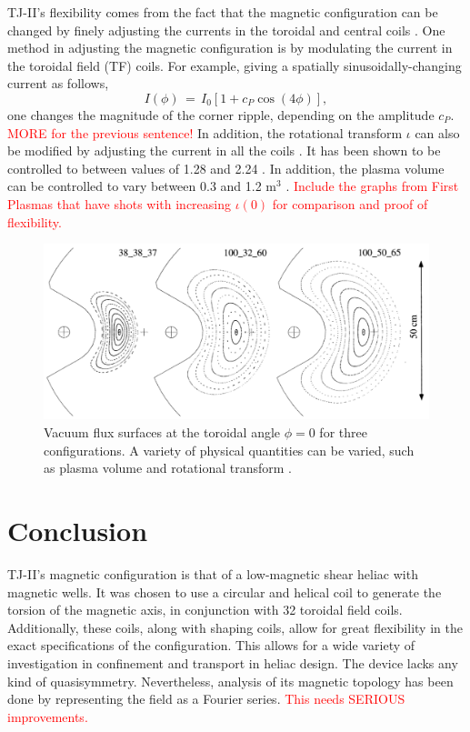 \documentclass[a4paper]{article}
\newcommand\mynotes[1]{\textcolor{red}{#1}}
\begin{document}
TJ-II's flexibility comes from the fact that the magnetic configuration can be changed by finely adjusting the currents in the toroidal and central coils \cite{solano_study_1988}.
One method in adjusting the magnetic configuration is by modulating the current in the toroidal field (TF) coils.
For example, giving a spatially sinusoidally-changing current as follows,
\begin{equation}
	I(\phi) \,=\, I_0 \left[1 + c_P\cos(4 \phi)\right],
\end{equation}
one changes the magnitude of the corner ripple, depending on the amplitude $c_P$.
\mynotes{MORE for the previous sentence!}
In addition, the rotational transform $\iota$ can also be modified by adjusting the current in all the coils \cite{solano_study_1988}.
It has been shown to be controlled to between values of 1.28 and 2.24 \cite{alejaldre_review_2001}. In addition, the plasma volume can be controlled to vary between 0.3 and 1.2 m$^3$ \cite{alejaldre_first_1999}.
\mynotes{Include the graphs from First Plasmas \cite{alejaldre_first_1999} that have shots with increasing $\iota(0)$ for comparison and proof of flexibility.}

\begin{figure}
\centering
	\includegraphics[width=\linewidth]{../Graphics/3_configs.png}
	\caption{Vacuum flux surfaces at the toroidal angle $\phi = 0$ for three configurations. A variety of physical quantities can be varied, such as plasma volume and rotational transform \cite{alejaldre_first_1999}.}
	\label{fig:3_configs}
\end{figure}


\section*{Conclusion}
TJ-II's magnetic configuration is that of a low-magnetic shear heliac with magnetic wells.
It was chosen to use a circular and helical coil to generate the torsion of the magnetic axis, in conjunction with 32 toroidal field coils.
Additionally, these coils, along with shaping coils, allow for great flexibility in the exact specifications of the configuration.
This allows for a wide variety of investigation in confinement and transport in heliac design.
The device lacks any kind of quasisymmetry. Nevertheless, analysis of its magnetic topology has been done by representing the field as a Fourier series.
\mynotes{This needs SERIOUS improvements.}




\end{document}
